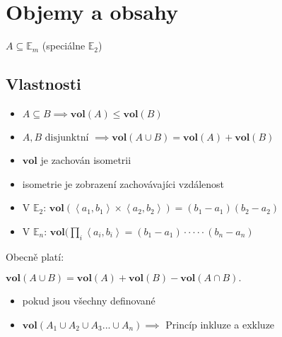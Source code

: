 \documentclass[../main.tex]{subfiles}
\begin{document}
\section{Objemy a obsahy}
\hspace{1.2mm}
$A \subseteq \mathbb{E}_m$ (speciálne $\mathbb{E}_2$)
\noindent

\subsection{Vlastnosti}
\hspace{1.2mm}
\begin{itemize}
    \item $A \subseteq B \implies \mathbf{vol}(A) \leq \mathbf{vol}(B)$
    \item $A, B \text{ disjunktní } \implies \mathbf{vol}(A \cup B) = \mathbf{vol}(A) + \mathbf{vol}(B)$
    \item $\mathbf{vol}$ je zachován isometrii
    \addtolength{\itemindent}{5mm}
    \item isometrie je zobrazení zachovávajíci vzdálenost
    \addtolength{\itemindent}{-5mm}
    \item V $\mathbb{E}_2$: $\mathbf{vol}(\left<a_1,b_1\right>\times \left<a_2,b_2\right>) = (b_1 - a_1)(b_2 - a_2)$
    \item V $\mathbb{E}_n$: $\mathbf{vol}(\prod_i \left<a_i,b_i\right> = (b_1 - a_1) \cdot \cdot \cdot \cdot \cdot (b_n-a_n)$
\end{itemize}

Obecně platí:

$\mathbf{vol}(A \cup B) = \mathbf{vol}(A)+\mathbf{vol}(B)-\mathbf{vol}(A \cap B).$

\begin{itemize}
    \addtolength{\itemindent}{5mm}
    \item pokud jsou všechny definované
    \item $\textbf{vol}(A_1\cup A_2\cup A_3...\cup A_n) \implies$ Princíp inkluze a exkluze
\end{itemize}
\end{document}
